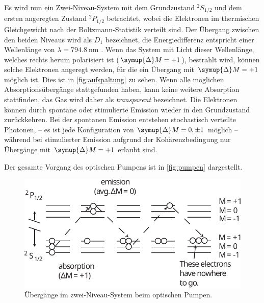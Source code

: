     Es wird nun ein Zwei-Niveau-System mit dem Grundzustand $^2S_{1/2}$ und dem ersten angeregten Zustand $^2P_{1/2}$ betrachtet,
    wobei die Elektronen im thermischen Gleichgewicht nach der Boltzmann-Statistik verteilt sind.
    Der Übergang zwischen den beiden Niveaus wird als $D_1$ bezeichnet,
    die Energiedifferenz entspricht einer Wellenlänge von $\lambda = \SI{794.8}{\nano\meter}$ \cite{versuchsanleitung}.
    Wenn das System mit Licht dieser Wellenlänge,
    welches rechts herum polarisiert ist ($\symup{\Delta}M = +1$),
    bestrahlt wird,
    können solche Elektronen angeregt werden,
    für die ein Übergang mit $\symup{\Delta}M = +1$ möglich ist.
    Dies ist in \autoref{fig:aufspaltung} zu sehen.
    Wenn alle möglichen Absorptionsübergänge stattgefunden haben,
    kann keine weitere Absorption stattfinden,
    das Gas wird daher als \textit{transparent} bezeichnet.
    Die Elektronen können durch spontane oder stimulierte Emission wieder in den Grundzustand zurückkehren.
    Bei der spontanen Emission entstehen stochastisch verteilte Photonen,
    – es ist jede Konfiguration von $\symup{\Delta}M = 0, \pm 1$ möglich –
    während bei stimulierter Emission aufgrund der Kohärenzbedingung nur Übergänge mit $\symup{\Delta}M = +1$ erlaubt sind.

    Der gesamte Vorgang des optischen Pumpens ist in \autoref{fig:pumpen} dargestellt.
    \begin{figure}[H]
        \centering
        \includegraphics[scale=1]{content/img/Lit2_Abb_8.pdf}
        \caption{Übergänge im zwei-Niveau-System beim optischen Pumpen. \cite{caltech}}
        \label{fig:pumpen}
    \end{figure}

